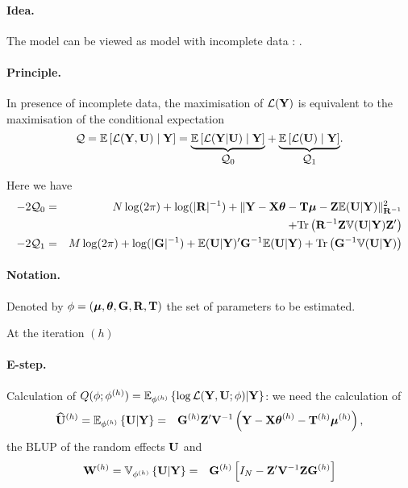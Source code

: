 \documentclass[17pt,landscape]{foils}
\newcommand{\Qcal}{\mathcal{Q}}
\newcommand{\Lcal}{\mathcal{L}}
\newcommand{\mubf}{\mbox{\mathversion{bold}{$\mu$}}}
\newcommand{\thetabf}{\mbox{\mathversion{bold}{$\theta$}}}
\newcommand{\Gbf}{{\bf G}}
\newcommand{\Rbf}{{\bf R}}
\newcommand{\Tbf}{{\bf T}}
\newcommand{\Ubf}{{\bf U}}
\newcommand{\Vbf}{{\bf V}}
\newcommand{\Xbf}{{\bf X}}
\newcommand{\Wbf}{{\bf W}}
\newcommand{\Ybf}{{\bf Y}}
\newcommand{\Zbf}{{\bf Z}}
\newcommand{\Esp}{{\mathbb E}}
\newcommand{\Var}{{\mathbb V}}
\newcommand{\emphase}[1]{\textblue{\sl #1}}
\newcommand{\ec}[1]{\mathbb{E}_{\phi^{(h)}}\left\{#1 |{\Ybf} \right\}}
\newcommand{\vc}[1]{\mathbb{V}_{\phi^{(h)}}\left\{#1 |{\Ybf} \right\}}
\begin{document}
\newpage
{} \foilhead[-.5in]{}

\paragraph{Idea.} The model can be viewed as model with incomplete data
: \emphase{$U$ is hidden}.


\paragraph{Principle.}
In presence of incomplete data, the maximisation of $\Lcal(\Ybf)$ is
equivalent to the maximisation of the conditional expectation
$$
\Qcal = \Esp\left[\Lcal(\Ybf, \Ubf) \; | \; \Ybf \right] =
\underset{\mbox{$\Qcal_0$}}{\underbrace{\Esp\left[\Lcal(\Ybf| \Ubf)
\; | \; \Ybf \right]}} +
\underset{\mbox{$\Qcal_1$}}{\underbrace{\Esp\left[\Lcal(\Ubf) \; |
\; \Ybf \right]}}.
$$

Here we have
\begin{eqnarray*}
-2 \Qcal_0& = & N \log(2\pi) +\log(|\Rbf|^{-1}) +\| \Ybf-\Xbf \thetabf -\Tbf \mubf- \Zbf \Esp(\Ubf|\Ybf)\|^2_{\Rbf^{-1}}\\
              && +  \text{Tr} \left( \Rbf^{-1} \Zbf \Var(\Ubf|\Ybf) \Zbf' \right) \\
-2\Qcal_1 & = & M \log(2\pi)+ \log(|\Gbf|^{-1}) + \Esp(\Ubf|\Ybf)'
\Gbf^{-1} \Esp(\Ubf|\Ybf)+\text{Tr} \left( \Gbf^{-1} \Var(\Ubf|\Ybf)
\right) 
\end{eqnarray*}





\newpage
{} \foilhead[-.5in]{}


\paragraph{Notation.} Denoted by $\phi=(\mubf,\thetabf,\Gbf,\Rbf,\Tbf)$ the set of parameters to be
estimated.

\vspace{1cm}

At the iteration $(h)$

\paragraph{E-step.} Calculation of $Q(\phi; \phi^{(h)})=\ec{\log
    \mathcal{L}(\Ybf,\Ubf;\phi)}$: we need the calculation of
\begin{eqnarray*}
  \widehat{\Ubf}^{(h)}=\ec{\Ubf} & = & \Gbf^{(h)} \Zbf' \Vbf^{-1} \left (\Ybf-\Xbf
\thetabf^{(h)}-\Tbf ^{(h)} \mubf^{(h)} \right ),
\end{eqnarray*}
the BLUP of the random effects $\Ubf$ and
\begin{eqnarray*}
\Wbf^{(h)} =\vc{\Ubf} & = & \Gbf^{(h)} \left [ I_N - \Zbf' \Vbf^{-1}
\Zbf \Gbf^{(h)} \right]
\end{eqnarray*}
\end{document}
